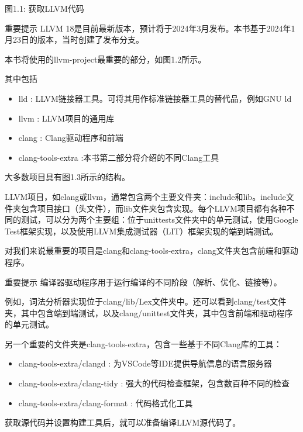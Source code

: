 \begin{center}
图1.1: 获取LLVM代码
\end{center}

\begin{myNotic}{重要提示}
LLVM 18是目前最新版本，预计将于2024年3月发布。本书基于2024年1月23日的版本，当时创建了发布分支。
\end{myNotic}

本书将使用的llvm-project最重要的部分，如图1.2所示。


其中包括

\begin{itemize}
\item
lld : LLVM链接器工具。可将其用作标准链接器工具的替代品，例如GNU ld

\item
llvm : LLVM项目的通用库

\item
clang : Clang驱动程序和前端

\item
clang-tools-extra :本书第二部分将介绍的不同Clang工具
\end{itemize}

大多数项目具有图1.3所示的结构。


LLVM项目，如clang或llvm，通常包含两个主要文件夹：include和lib。include文件夹包含项目接口（头文件），而lib文件夹包含实现。每个LLVM项目都有各种不同的测试，可以分为两个主要组：位于unittests文件夹中的单元测试，使用Google Test框架实现，以及使用LLVM集成测试器（LIT）框架实现的端到端测试。

对我们来说最重要的项目是clang和clang-tools-extra，clang文件夹包含前端和驱动程序。

\begin{myNotic}{重要提示}
编译器驱动程序用于运行编译的不同阶段（解析、优化、链接等）。
\end{myNotic}

例如，词法分析器实现位于clang/lib/Lex文件夹中。还可以看到clang/test文件夹，其中包含端到端测试，以及clang/unittest文件夹，其中包含前端和驱动程序的单元测试。

另一个重要的文件夹是clang-tools-extra，包含一些基于不同Clang库的工具：

\begin{itemize}
\item
clang-tools-extra/clangd : 为VSCode等IDE提供导航信息的语言服务器

\item
clang-tools-extra/clang-tidy : 强大的代码检查框架，包含数百种不同的检查

\item
clang-tools-extra/clang-format :  代码格式化工具
\end{itemize}

获取源代码并设置构建工具后，就可以准备编译LLVM源代码了。























